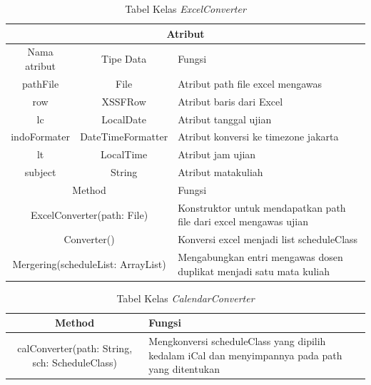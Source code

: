 \begin{table}[H]
	\centering
		\caption{Tabel Kelas \textit{ExcelConverter}}
		\label{tab:excel_converter}
		\begin{tabular}{ | c | c | p{4cm} |}
			\hline
				\multicolumn{3}{|c|}{Atribut} \\ \hline 
				Nama atribut & Tipe Data  & Fungsi \\ \hline
				pathFile & File & Atribut path file excel mengawas\\ \hline
				row & XSSFRow & Atribut baris dari Excel\\ \hline
				lc & LocalDate & Atribut tanggal ujian\\ \hline
				indoFormater & DateTimeFormatter & Atribut konversi ke timezone jakarta\\ \hline
				lt & LocalTime & Atribut jam ujian\\ \hline
				subject & String & Atribut matakuliah\\ \hline
				\multicolumn{2}{|c|}{Method} & Fungsi \\ \hline
				\multicolumn{2}{|c|}{ExcelConverter(path: File)} & Konstruktor untuk mendapatkan path file dari excel mengawas ujian\\ \hline
				\multicolumn{2}{|c|}{Converter()} & Konversi excel menjadi list scheduleClass \\ \hline
				\multicolumn{2}{|c|}{Mergering(scheduleList: ArrayList)} & Mengabungkan entri mengawas dosen  duplikat menjadi satu mata kuliah \\ \hline
		\end{tabular}
\end{table}

\begin{table}[H]
	\centering
		\caption{Tabel Kelas \textit{CalendarConverter}}
		\label{tab:excel_converter}
		\begin{tabular}{ | c | c | p{4cm} |}
			\hline
				\multicolumn{2}{|c|}{Method} & Fungsi \\ \hline
				\multicolumn{2}{|c|}{calConverter(path: String, sch: ScheduleClass)} & Mengkonversi scheduleClass yang dipilih kedalam iCal dan menyimpannya pada path yang ditentukan\\ \hline
		\end{tabular}
\end{table}

